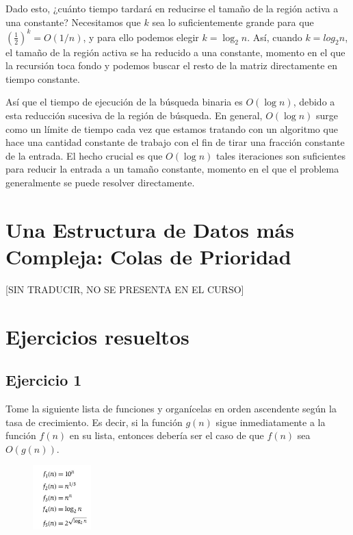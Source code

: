 \documentclass[a4paper, 12pt]{book}
\theoremstyle{dotless}
\begin{document}
Dado esto, ¿cuánto tiempo tardará en reducirse el tamaño de la región activa a una constante? Necesitamos que $k$ sea lo suficientemente grande para que $\left(\frac{1}{2}\right)^{k}=O(1 / n)$, y para ello podemos elegir $k=\log _{2} n$. Así, cuando $k=log _{2} n$, el tamaño de la región activa se ha reducido a una constante, momento en el que la recursión toca fondo y podemos buscar el resto de la matriz directamente en tiempo constante.

Así que el tiempo de ejecución de la búsqueda binaria es $O(\log n)$, debido a esta reducción sucesiva de la región de búsqueda. En general, $O(\log n)$ surge como un límite de tiempo cada vez que estamos tratando con un algoritmo que hace una cantidad constante de trabajo con el fin de tirar una fracción constante de la entrada. El hecho crucial es que $O(\log n)$ tales iteraciones son suficientes para reducir la entrada a un tamaño constante, momento en el que el problema generalmente se puede resolver directamente.





\section{Una Estructura de Datos más Compleja: Colas de Prioridad}

[SIN TRADUCIR, NO SE PRESENTA EN EL CURSO]

\section{Ejercicios resueltos}

\subsection*{Ejercicio 1} 

Tome la siguiente lista de funciones y organícelas en orden ascendente según la tasa de crecimiento. Es decir, si la función $g(n)$ sigue inmediatamente a la función $f(n)$ en su lista, entonces debería ser el caso de que $f(n)$ sea $O(g(n))$.\\

\begin{figure}[h] 
  \centering
    \includegraphics[width=0.2\textwidth]{Imagenes-Seccion2/form2_1.PNG}
\end{figure}
\end{document}
